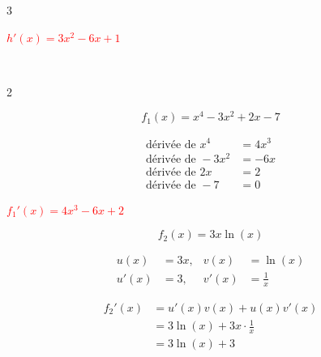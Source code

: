 \documentclass[11pt,a4paper]{article}
\begin{document}
\begin{multicols}{3}
\begin{center}
\begin{tcolorbox}[colback=red!5!white,colframe=red!75!black]
{\vspace{2mm}

\textbf{\textcolor{red}{$h'(x)=3x^2-6x+1$}} 

\vspace{2mm}
}
\end{tcolorbox}

\end{center}

\end{multicols}

\newpage

 \\
\begin{multicols}{2}
\begin{tcolorbox}[colback=red!5!white,colframe=red!75!black]
{
\[
f_1(x) = x^4 - 3x^2 + 2x - 7
\]

\[
\begin{aligned}
\text{dérivée de } x^4 & = 4x^3 \\
\text{dérivée de } -3x^2 & = -6x\\
\text{dérivée de } 2x & = 2\\
\text{dérivée de } -7 & = 0
\end{aligned}
\]

\vspace{4mm}

\begin{center}

    \textbf{\textcolor{red}{$f_1'(x) = 4x^3 - 6x + 2$}}

\end{center}

\vspace{43mm}

}
\end{tcolorbox}

\begin{tcolorbox}[colback=red!5!white,colframe=red!75!black]
{
\[
f_2(x) = 3x \ln(x)
\]

\[
\begin{aligned}
u(x) &= 3x, & v(x) &= \ln(x) \\
u'(x) &= 3, & v'(x) &= \frac{1}{x}
\end{aligned}
\]

\[
\begin{aligned}
    f_2'(x) & = u'(x)v(x) + u(x)v'(x)  \\
            & = 3 \ln(x) + 3x \cdot \frac{1}{x} \\
            &  = 3\ln(x) + 3
\end{aligned}
\]

}
\end{tcolorbox}
\end{multicols}
\end{document}
